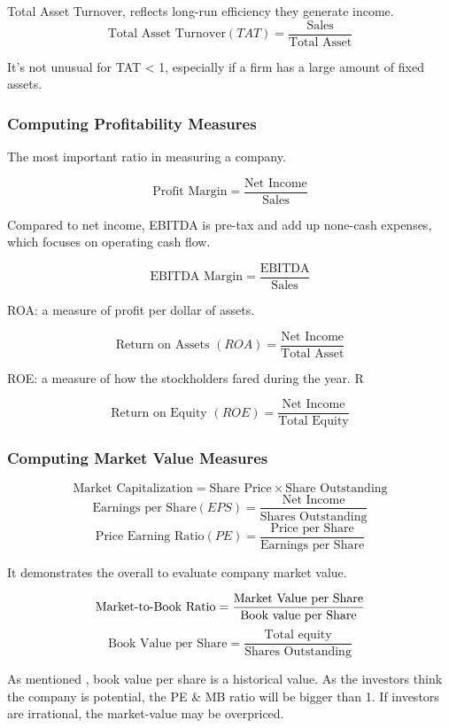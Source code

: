 \documentclass[10pt, a4paper]{article}
\begin{document}
        Total Asset Turnover, reflects long-run efficiency they generate income. 
            $$\text{Total\ Asset\ Turnover}(TAT) = \frac{\text{Sales}}{\text{Total\ Asset}}$$

            It's not unusual for TAT < 1, especially if a firm has a large amount of fixed assets.  
        \subsubsection{Computing Profitability Measures}    
            The most important ratio in measuring a company.   


            $$\text{Profit\ Margin} = \frac{\text{Net\ Income}}{\text{Sales}}$$

            Compared to net income, EBITDA is pre-tax and add up none-cash expenses, which focuses on operating cash flow. 

            $$\text{EBITDA\ Margin} = \frac{\text{EBITDA}}{\text{Sales}}$$
            
            ROA: a measure of profit per dollar of assets. 

            $$\text{Return\ on\ Assets } (ROA) = \frac{\text{Net\ Income}}{\text{Total\ Asset}}$$

            ROE: a measure of how the stockholders fared during the year. R

            $$\text{Return\ on\ Equity } (ROE) = \frac{\text{Net\ Income}}{\text{Total\ Equity}}$$
        \subsubsection{Computing Market Value Measures}
            $$\text{Market\ Capitalization} = \text{Share\ Price} \times \text{Share\ Outstanding}$$
            $$\text{Earnings per Share} (EPS)= \frac{\text{Net\ Income}}{\text{Shares\ Outstanding}}$$
            $$\text{Price Earning Ratio} (PE) = \frac{\text{Price\ per\ Share}}{\text{Earnings\ per\ Share}}$$

            It demonstrates the overall to evaluate company market value. 

            $$\text{Market\text{-}to\text{-}Book\ Ratio} = \frac{\text{Market\ Value\ per\ Share}}
            {\text{Book\ value\ per\ Share}}$$
            $$\text{Book Value per Share} = \frac{\text{Total equity}}{\text{Shares Outstanding}}$$

            As mentioned , book value per share is a historical value. As the investors think the company is potential, the PE \& MB ratio will be bigger than 1. If investors are irrational, the market-value may be overpriced. 
\end{document}
